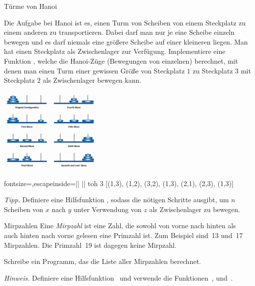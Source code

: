 \documentclass{uebblatt}
\begin{document}
\begin{aufgabe}{Türme von Hanoi}
  \begin{minipage}[m]{0.67 \linewidth}
    Die Aufgabe bei Hanoi ist es, einen Turm von Scheiben von einem Steckplatz zu einem anderen zu transportieren. Dabei darf man nur je eine Scheibe einzeln bewegen und es darf niemals eine größere Scheibe auf einer kleineren liegen. Man hat einen Steckplatz als Zwischenlager zur Verfügung.
    Implementiere eine Funktion , welche die Hanoi-Züge (Bewegungen von einzelnen) berechnet, mit denen man einen Turm einer gewissen Größe von Steckplatz $1$ zu Steckplatz $3$ mit Steckplatz $2$ als Zwischenlager bewegen kann.
  \end{minipage}
  \begin{minipage}{0.32 \linewidth}
    \hfill \includegraphics[width=5cm]{towers-hanoi.png}
  \end{minipage}
  
  \begin{haskellcode*}{fontsize=\small,escapeinside=||}
|\ghci| toh 3
[(1,3), (1,2), (3,2), (1,3), (2,1), (2,3), (1,3)]
  \end{haskellcode*}
  
  {\scriptsize \emph{Tipp.} Definiere eine Hilfsfunktion , sodass  die nötigen Schritte ausgibt, um $n$ Scheiben von $x$ nach $y$ unter Verwendung von $z$ als Zwischenlager zu bewegen.\par}
\end{aufgabe}

\begin{aufgabe}{Mirpzahlen}
Eine \emph{Mirpzahl} ist eine Zahl, die sowohl von vorne nach hinten als auch
hinten nach vorne gelesen eine Primzahl ist. Zum Beispiel sind~13 und~17
Mirpzahlen. Die Primzahl~19 ist dagegen keine Mirpzahl.

Schreibe ein Programm, das die Liste aller Mirpzahlen berechnet.

{\scriptsize\emph{Hinweis.} Definiere eine Hilfsfunktion~ und verwende die Funktionen~,  und~.\par}
\end{aufgabe}
\end{document}
